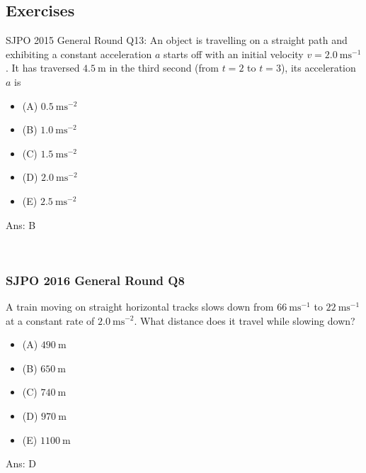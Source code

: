 \documentclass{article}
\begin{document}
\subsection{Exercises}
\begin{samepage}
    
SJPO 2015 General Round Q13: An object is travelling on a straight path and exhibiting a constant acceleration $a$ starts off with an initial velocity $v=2.0 \mathrm{~ms}^{-1}$. It has traversed $4.5 \mathrm{~m}$ in the third second (from $t=2$ to $t=3$), its acceleration $a$ is
\begin{itemize}\item[](A) $0.5 \mathrm{~ms}^{-2}$
 \item[](B) $1.0 \mathrm{~ms}^{-2}$
\item[](C) $1.5 \mathrm{~ms}^{-2}$
\item[](D) $2.0 \mathrm{~ms}^{-2}$
\item[](E) $2.5 \mathrm{~ms}^{-2}$
\end{itemize}
Ans: \ifpaper B \fi
\end{samepage}
\\[20pt]
\begin{samepage}
\subsubsection{SJPO 2016 General Round Q8}
A train moving on straight horizontal tracks slows down from $66 \mathrm{~ms}^{-1}$ to $22 \mathrm{~ms}^{-1}$ at a constant rate of $2.0 \mathrm{~ms}^{-2}$. What distance does it travel while slowing down?
\begin{itemize}
\item[](A) $490 \mathrm{~m}$
\item[](B) $650 \mathrm{~m}$
\item[](C) $740 \mathrm{~m}$
\item[](D) $970 \mathrm{~m}$ 
\item[](E) $1100 \mathrm{~m}$ \end{itemize}
Ans: \ifpaper D \fi
\end{samepage}
\end{document}
